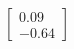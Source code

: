 \documentclass[preview]{standalone}
\begin{document}
\begin{align*}
\begin{bmatrix} 0.09 \\ -0.64 \end{bmatrix}
\end{align*}
\end{document}
